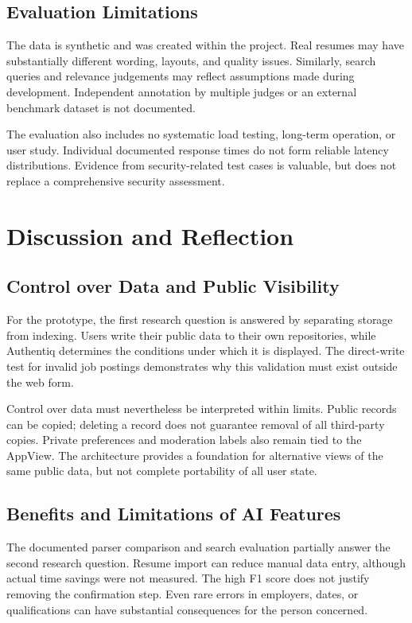 \documentclass[11pt,a4paper]{article}
\begin{document}
\subsection{Evaluation Limitations}

The data is synthetic and was created within the project. Real resumes may have substantially different wording, layouts, and quality issues. Similarly, search queries and relevance judgements may reflect assumptions made during development. Independent annotation by multiple judges or an external benchmark dataset is not documented.

The evaluation also includes no systematic load testing, long-term operation, or user study. Individual documented response times do not form reliable latency distributions. Evidence from security-related test cases is valuable, but does not replace a comprehensive security assessment.

\section{Discussion and Reflection}

\subsection{Control over Data and Public Visibility}

For the prototype, the first research question is answered by separating storage from indexing. Users write their public data to their own repositories, while Authentiq determines the conditions under which it is displayed. The direct-write test for invalid job postings demonstrates why this validation must exist outside the web form.

Control over data must nevertheless be interpreted within limits. Public records can be copied; deleting a record does not guarantee removal of all third-party copies. Private preferences and moderation labels also remain tied to the AppView. The architecture provides a foundation for alternative views of the same public data, but not complete portability of all user state.

\subsection{Benefits and Limitations of AI Features}

The documented parser comparison and search evaluation partially answer the second research question. Resume import can reduce manual data entry, although actual time savings were not measured. The high F1 score does not justify removing the confirmation step. Even rare errors in employers, dates, or qualifications can have substantial consequences for the person concerned.
\end{document}
